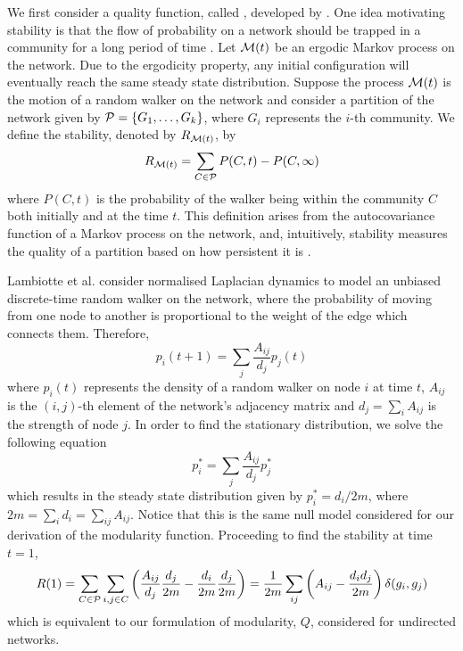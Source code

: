 We first consider a quality function, called , developed by \cite{LDB08}.
One idea motivating stability is that the flow of probability on a network should be trapped in a community for a long period of time \cite{Lam10}.
Let $\mathcal M(t)$ be an ergodic Markov process on the network.
Due to the ergodicity property, any initial configuration will eventually reach the same steady state distribution.
Suppose the process $\mathcal M(t)$ is the motion of a random walker on the network and consider a partition of the network given by $\mathcal P = \{ G_{1},\dots,G_{k} \}$, where $G_{i}$ represents the $i$-th community.
We define the stability, denoted by $R_{\mathcal M(t)}$, by
\begin{equation}
	\label{eq:stability}
	R_{\mathcal M(t)} = \sum_{C \in \mathcal P} P(C,t) - P(C,\infty)
\end{equation}
where $P(C,t)$ is the probability of the walker being within the community $C$ both initially and at the time $t$.
This definition arises from the autocovariance function of a Markov process on the network, and, intuitively, stability measures the quality of a partition based on how persistent it is \cite{DYB08}.

Lambiotte et al. \cite{LDB08} consider normalised Laplacian dynamics to model an unbiased discrete-time random walker on the network, where the probability of moving from one node to another is proportional to the weight of the edge which connects them.
Therefore,
\begin{equation}
	\label{eq:densityRandomWalker}
	p_{i}(t+1) = \sum_{j} \frac{A_{ij}}{d_{j}} p_{j}(t)
\end{equation}
where $p_{i}(t)$ represents the density of a random walker on node $i$ at time $t$, $A_{ij}$ is the $(i,j)$-th element of the network's adjacency matrix and $d_{j} = \sum_{i} A_{ij}$ is the strength of node $j$.
In order to find the stationary distribution, we solve the following equation
\begin{equation}
	\label{eq:solveDensityRandomWalkerStationaryDistribution}
	p_{i}^{*} = \sum_{j} \frac{A_{ij}}{d_{j}} p_{j}^{*}
\end{equation}
which results in the steady state distribution given by $p_{i}^{*} = d_{i}/2m$, where $2m = \sum_{i} d_{i} = \sum_{ij} A_{ij}$.
Notice that this is the same null model considered for our derivation of the modularity function.
Proceeding to find the stability at time $t=1$,
\begin{equation}
	\label{eq:stabilityAtTime1}
	R(1) = \sum_{C \in \mathcal P} \sum_{i,j \in C} \left( \frac{A_{ij}}{d_{j}} \frac{d_{j}}{2m} - \frac{d_{i}}{2m} \frac{d_{j}}{2m} \right) = \frac{1}{2m} \sum_{ij} \left( A_{ij} - \frac{d_{i}d_{j}}{2m} \right) \delta(g_{i},g_{j})
\end{equation}
which is equivalent to our formulation of modularity, $Q$, considered for undirected networks.

